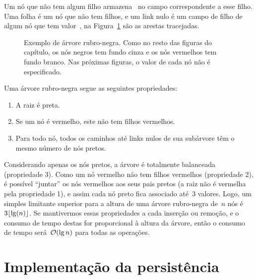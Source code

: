 \documentclass[../../main.tex]{subfiles}
\begin{document}
Um nó que não tem algum filho armazena~ no campo correspondente a esse filho. Uma folha é um nó que não tem filhos, e um link nulo é um campo de filho de algum nó que tem valor~, na Figura~\ref{fig:arv_bin_ex} são as arestas tracejadas.

\begin{figure}
\centering
{}
\caption{Exemplo de árvore rubro-negra. Como no resto das figuras do capítulo, os nós negros tem fundo cinza e os nós vermelhos tem fundo branco. Nas próximas figuras, o valor de cada nó não é especificado.} \label{fig:arv_bin_ex}
\end{figure}

Uma árvore rubro-negra segue as seguintes propriedades:
\begin{enumerate}
\item A raiz é preta.
\item Se um nó é vermelho, este não tem filhos vermelhos.
\item Para todo nó, todos os caminhos até links nulos de sua subárvore têm o mesmo número de nós pretos.
\end{enumerate}

Considerando apenas os nós pretos, a árvore é totalmente balanceada (propriedade 3). Como um nó vermelho não tem filhos vermelhos (propriedade 2), é possível ``juntar'' os nós vermelhos aos seus pais pretos (a raiz não é vermelha pela propriedade 1), e assim cada nó preto fica associado até~3 valores. Logo, um simples limitante superior para a altura de uma árvore rubro-negra de~$n$ nós é~$3\lfloor\lg(n)\rfloor$. Se mantivermos essas propriedades a cada inserção ou remoção, e o consumo de tempo destas for proporcional à altura da árvore, então o consumo de tempo será~$\mathcal{O}(\lg n)$ para todas as operações.

\section{Implementação da persistência}
\end{document}
